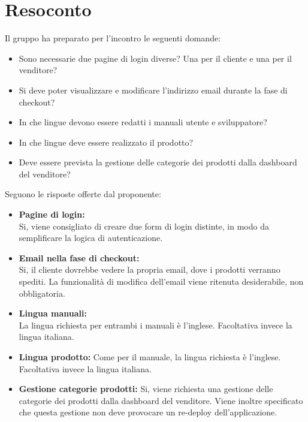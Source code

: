 \section{Resoconto}
Il gruppo ha preparato per l'incontro le seguenti domande:
\begin{itemize}
\item Sono necessarie due pagine di login diverse? Una per il cliente e una per il venditore?
\item Si deve poter visualizzare e modificare l'indirizzo email durante la fase di checkout?
\item In che lingue devono essere redatti i manuali utente e sviluppatore?
\item In che lingue deve essere realizzato il prodotto?
\item Deve essere prevista la gestione delle categorie dei prodotti dalla dashboard del venditore?

\end{itemize}
Seguono le risposte offerte dal proponente:
\begin{itemize}
\item \textbf{Pagine di login:}\\
Si, viene consigliato di creare due form di login distinte, in modo da semplificare la logica di autenticazione.
\item \textbf{Email nella fase di checkout:}\\
Si, il cliente dovrebbe vedere la propria email, dove i prodotti verranno spediti. La funzionalità di modifica dell'email viene ritenuta desiderabile, non obbligatoria. 
\item \textbf{Lingua manuali:}\\
La lingua richiesta per entrambi i manuali è l'inglese. Facoltativa invece la lingua italiana.
\item \textbf{Lingua prodotto:}
Come per il manuale, la lingua richiesta è l'inglese. Facoltativa invece la lingua italiana.
\item \textbf{Gestione categorie prodotti:}
Si, viene richiesta una gestione delle categorie dei prodotti dalla dashboard del venditore. Viene inoltre specificato che questa gestione non deve provocare un re-deploy dell'applicazione.
\end{itemize}


